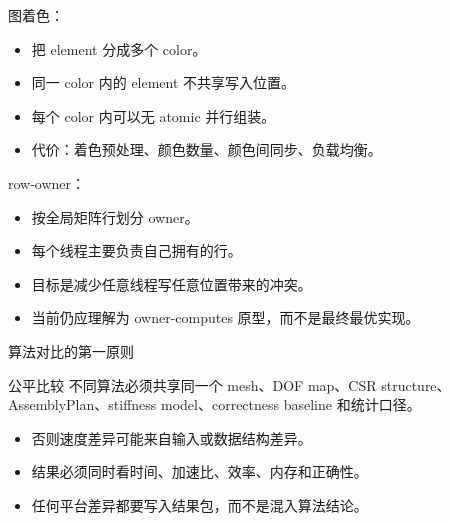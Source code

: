 \begin{frame}{图着色：}
\begin{itemize}
  \item 把 element 分成多个 color。
  \item 同一 color 内的 element 不共享写入位置。
  \item 每个 color 内可以无 atomic 并行组装。
  \item 代价：着色预处理、颜色数量、颜色间同步、负载均衡。
\end{itemize}
\end{frame}

\begin{frame}{row-owner：}
\begin{itemize}
  \item 按全局矩阵行划分 owner。
  \item 每个线程主要负责自己拥有的行。
  \item 目标是减少任意线程写任意位置带来的冲突。
  \item 当前仍应理解为 owner-computes 原型，而不是最终最优实现。
\end{itemize}
\end{frame}

\begin{frame}{算法对比的第一原则}
\begin{block}{公平比较}
不同算法必须共享同一个 mesh、DOF map、CSR structure、AssemblyPlan、stiffness model、correctness baseline 和统计口径。
\end{block}
\begin{itemize}
  \item 否则速度差异可能来自输入或数据结构差异。
  \item 结果必须同时看时间、加速比、效率、内存和正确性。
  \item 任何平台差异都要写入结果包，而不是混入算法结论。
\end{itemize}
\end{frame}
